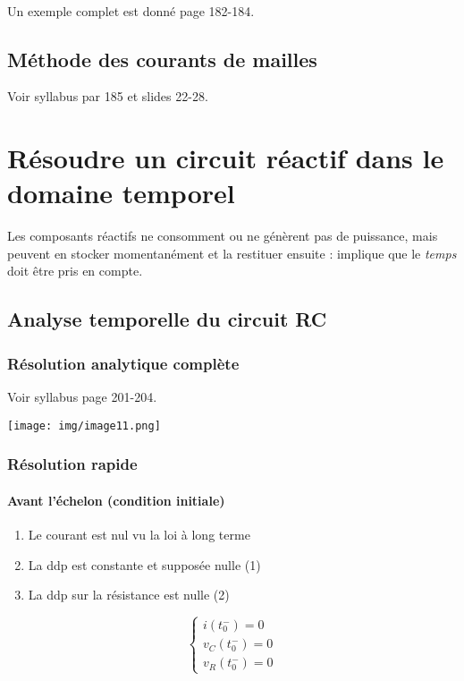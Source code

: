 \documentclass[11pt, a4paper, openany]{book}
\begin{document}
		\ \\
		Un exemple complet est donné page 182-184.
		
		\section{Méthode des courants de mailles}
		Voir syllabus par 185 et slides 22-28.
		\chapter{Résoudre un circuit réactif dans le domaine temporel}
		Les composants réactifs ne consomment ou ne génèrent pas de puissance, mais peuvent en stocker momentanément et la restituer ensuite : implique que le \textit{temps} doit être pris en compte.
		
		\setcounter{section}{1}
		\section{Analyse temporelle du circuit RC}
		\subsection{Résolution analytique complète}
		Voir syllabus page 201-204.
		\begin{center}
			\texttt{[image: img/image11.png]}
		\end{center}
		
		\subsection{Résolution rapide}
		\subsubsection{Avant l'échelon (condition initiale)}
		\begin{enumerate}
			\item Le courant est nul vu la loi à long terme
			\item La ddp est constante et supposée nulle (1)
			\item La ddp sur la résistance est nulle (2)
		\end{enumerate}
		\begin{equation}
		\left\{\begin{array}{l}
		i(t_0^-) = 0\\
		v_C(t_0^-) = 0\\
		v_R(t_0^-) = 0
		\end{array}\right.
		\end{equation}
		
\end{document}
